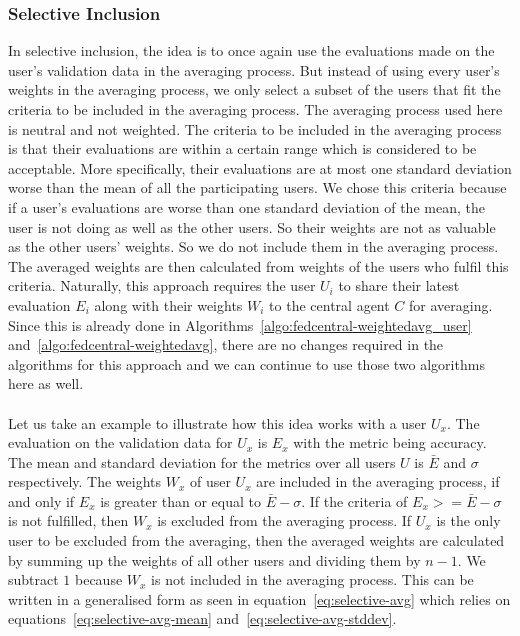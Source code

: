 \documentclass[12pt]{article}
\begin{document}
\subsubsection{Selective Inclusion}\label{subsubsec:selective-inclusion}
In selective inclusion, the idea is to once again use the evaluations made on the user's validation data in the averaging process. But instead of using every user's weights in the averaging process, we only select a subset of the users that fit the criteria to be included in the averaging process. The averaging process used here is neutral and not weighted. The criteria to be included in the averaging process is that their evaluations are within a certain range which is considered to be acceptable. More specifically, their evaluations are at most one standard deviation worse than the mean of all the participating users. We chose this criteria because if a user's evaluations are worse than one standard deviation of the mean, the user is not doing as well as the other users. So their weights are not as valuable as the other users' weights. So we do not include them in the averaging process.  The averaged weights are then calculated from weights of the users who fulfil this criteria. Naturally, this approach requires the user $U_i$ to share their latest evaluation $E_i$ along with their weights $W_i$ to the central agent $C$ for averaging. Since this is already done in Algorithms~\ref{algo:fedcentral-weightedavg_user} and~\ref{algo:fedcentral-weightedavg}, there are no changes required in the algorithms for this approach and we can continue to use those two algorithms here as well.
\\\\
Let us take an example to illustrate how this idea works with a user $U_x$. The evaluation on the validation data for $U_x$ is $E_x$ with the metric being accuracy. The mean and standard deviation for the metrics over all users $U$ is $\bar{E}$ and $\sigma$ respectively. The weights $W_x$ of user $U_x$ are included in the averaging process, if and only if $E_x$ is greater than or equal to $\bar{E}-\sigma$. If the criteria of $E_x >= \bar{E}-\sigma$ is not fulfilled, then $W_x$ is excluded from the averaging process. If $U_x$ is the only user to be excluded from the averaging, then the averaged weights are calculated by summing up the weights of all other users and dividing them by $n-1$. We subtract $1$ because $W_x$ is not included in the averaging process. This can be written in a generalised form as seen in equation~\ref{eq:selective-avg} which relies on equations~\ref{eq:selective-avg-mean} and~\ref{eq:selective-avg-stddev}.
\end{document}
